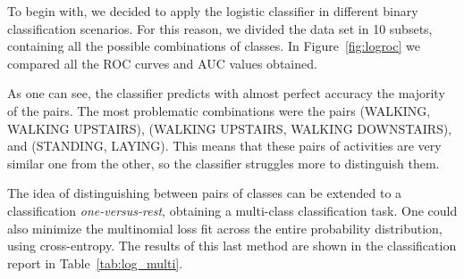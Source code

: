 \documentclass[10pt, a4paper, twocolumn]{article}
\begin{document}
To begin with, we decided to apply the logistic classifier in different binary classification scenarios. For this reason, we divided the data set in 10 subsets, containing all the possible combinations of classes. In Figure~\ref{fig:logroc} we compared all the ROC curves and AUC values obtained.

As one can see, the classifier predicts with almost perfect accuracy the majority of the pairs. The most problematic combinations were the pairs (WALKING, WALKING UPSTAIRS), (WALKING UPSTAIRS, WALKING DOWNSTAIRS), and (STANDING, LAYING). This means that these pairs of activities are very similar one from the other, so the classifier struggles more to distinguish them. 

The idea of distinguishing between pairs of classes can be extended to a classification \textit{one-versus-rest}, obtaining a multi-class classification task. One could also minimize the multinomial loss fit across the entire probability distribution, using cross-entropy. The results of this last method are shown in the classification report in Table~\ref{tab:log_multi}.


\begin{table}
\caption{Classification report for multiclass logistic regression.}
\label{tab:log_multi}
\centering
{}
\end{table}
\end{document}
